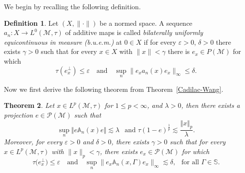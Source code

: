 \documentclass[11pt]{amsart}
\newtheorem{thm}{Theorem}[section]
\theoremstyle{definition}
\newtheorem{defn}[thm]{Definition}
\theoremstyle{myremark}
\numberwithin{equation}{section}
\def\A{\mathbb A}
\def\S{\mathbb S}
\newcommand{\CM}{\mathcal{M}}
\newcommand{\CP}{\mathcal{P}}
\newcommand{\norm}[1]{\left\Vert#1\right\Vert}
\begin{document}
We begin by recalling the following definition.
\begin{defn}
      Let $(X, \|\cdot\|)$ be a normed space. A sequence $a_n : X \to L^0(\CM, \tau)$ of additive maps is called \textit{bilaterally uniformly equicontinuous in measure (b.u.e.m.)} at $0 \in X$ if for every $\varepsilon > 0$, $\delta > 0$ there exists $\gamma > 0$ such that for every $x \in X$ with $\|x\| < \gamma$ there is $e_x \in P(\mathcal{M})$ for which
\[
\tau(e_x^\perp) \leq \varepsilon \quad \text{and} \quad \sup_n \|e_x a_n(x) e_x\|_\infty \leq \delta.
\]
  \end{defn}


Now we first derive the following theorem from Theorem~\ref{Cadilac-Wang}.
\begin{thm}\label{maximal_inequality}
    Let $ x \in L^p(\CM, \tau)$ for $ 1\leq p  < \infty $, and $\lambda > 0$, then there exists a projection $e \in \CP(\CM)$ such that 
    $$ \sup_n \norm{ e\A_n( x) e } \lesssim \lambda ~~\text{ and } \tau( 1-e)^{ \frac{1}{p}}  \lesssim\frac{ \norm{ x}_p}{ \lambda}.$$
 Moreover, for every $\varepsilon > 0$ and $\delta > 0$, there exists $\gamma > 0$ such that for every $x \in L^p( \CM, \tau)$ with $\|x\|_p < \gamma$, there exists $e_x \in \CP(\CM)$ for which
\[
\tau\bigl(e_x^\perp\bigr) \leq \varepsilon
\quad \text{and} \quad
\sup_n \bigl\| e_x \A_n(x, \Gamma) e_x \bigr\|_\infty \lesssim \delta,  ~~\text{ for all } \Gamma \in \S.
\]
\end{thm}
\end{document}
